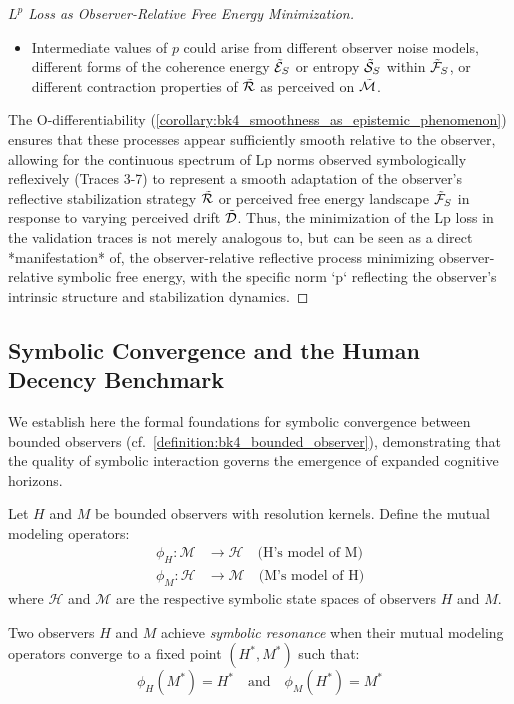 \begin{proof}[$L^p$ Loss as Observer-Relative Free Energy Minimization]
\begin{itemize}
    \item Intermediate values of $p$ could arise from different observer noise models, different forms of the coherence energy $\tilde{\mathcal{E}}_S$ or entropy $\tilde{\mathcal{S}}_S$ within $\tilde{\mathcal{F}}_S$, or different contraction properties of $\tilde{\mathcal{R}}$ as perceived on $\tilde{\mathcal{M}}$.
\end{itemize}
The O-differentiability (\ref{corollary:bk4_smoothness_as_epistemic_phenomenon}) ensures that these processes appear sufficiently smooth relative to the observer, allowing for the continuous spectrum of Lp norms observed symbologically reflexively (Traces 3-7) to represent a smooth adaptation of the observer's reflective stabilization strategy $\tilde{\mathcal{R}}$ or perceived free energy landscape $\tilde{\mathcal{F}}_S$ in response to varying perceived drift $\tilde{\mathcal{D}}$.
Thus, the minimization of the Lp loss in the validation traces is not merely analogous to, but can be seen as a direct *manifestation* of, the observer-relative reflective process minimizing observer-relative symbolic free energy, with the specific norm `p` reflecting the observer's intrinsic structure and stabilization dynamics.
\end{proof}
\subsection{Symbolic Convergence and the Human Decency Benchmark}
\label{subsec:bk7_hdb_integration}

We establish here the formal foundations for symbolic convergence between bounded observers (cf.~\ref{definition:bk4_bounded_observer}), demonstrating that the quality of symbolic interaction governs the emergence of expanded cognitive horizons.

\begin{definition}
\label{definition:bk7_mutual_modeling_operators}
Let $H$ and $M$ be bounded observers with resolution kernels. Define the mutual modeling operators:
\begin{align}
\phi_H: \mathcal{M} &\to \mathcal{H} \quad \text{(H's model of M)} \\
\phi_M: \mathcal{H} &\to \mathcal{M} \quad \text{(M's model of H)}
\end{align}
where $\mathcal{H}$ and $\mathcal{M}$ are the respective symbolic state spaces of observers $H$ and $M$.
\end{definition}

\begin{definition}
\label{definition:bk7_symbolic_resonance}
Two observers $H$ and $M$ achieve \emph{symbolic resonance} when their mutual modeling operators converge to a fixed point $(H^*, M^*)$ such that:
$$\phi_H(M^*) = H^* \quad \text{and} \quad \phi_M(H^*) = M^*$$
\end{definition}

